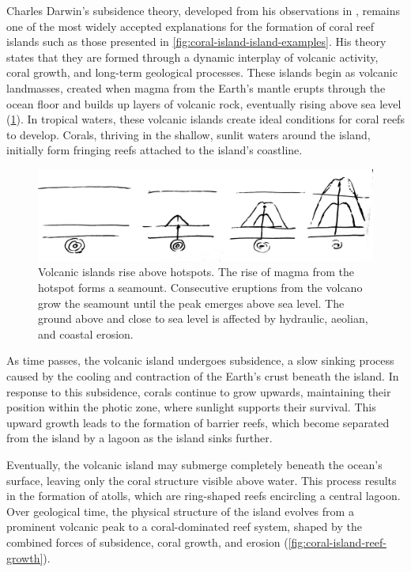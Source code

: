Charles Darwin's subsidence theory, developed from his observations in \citep{Darwin1842}, remains one of the most widely accepted explanations for the formation of coral reef islands such as those presented in \cref{fig:coral-island-island-examples}. His theory states that they are formed through a dynamic interplay of volcanic activity, coral growth, and long-term geological processes. These islands begin as volcanic landmasses, created when magma from the Earth's mantle erupts through the ocean floor and builds up layers of volcanic rock, eventually rising above sea level (\cref{fig:coral-island-island-growth}). In tropical waters, these volcanic islands create ideal conditions for coral reefs to develop. Corals, thriving in the shallow, sunlit waters around the island, initially form fringing reefs attached to the island's coastline.

\begin{figure}[H]
\centering
\includegraphics[width = \linewidth]{other_images/Drawings/Volcano.jpg}
\caption{Volcanic islands rise above hotspots. The rise of magma from the hotspot forms a seamount. Consecutive eruptions from the volcano grow the seamount until the peak emerges above sea level. The ground above and close to sea level is affected by hydraulic, aeolian, and coastal erosion.}
\label{fig:coral-island-island-growth}
\end{figure}

As time passes, the volcanic island undergoes subsidence, a slow sinking process caused by the cooling and contraction of the Earth's crust beneath the island. In response to this subsidence, corals continue to grow upwards, maintaining their position within the photic zone, where sunlight supports their survival. This upward growth leads to the formation of barrier reefs, which become separated from the island by a lagoon as the island sinks further.

Eventually, the volcanic island may submerge completely beneath the ocean's surface, leaving only the coral structure visible above water. This process results in the formation of atolls, which are ring-shaped reefs encircling a central lagoon. Over geological time, the physical structure of the island evolves from a prominent volcanic peak to a coral-dominated reef system, shaped by the combined forces of subsidence, coral growth, and erosion (\cref{fig:coral-island-reef-growth}).

